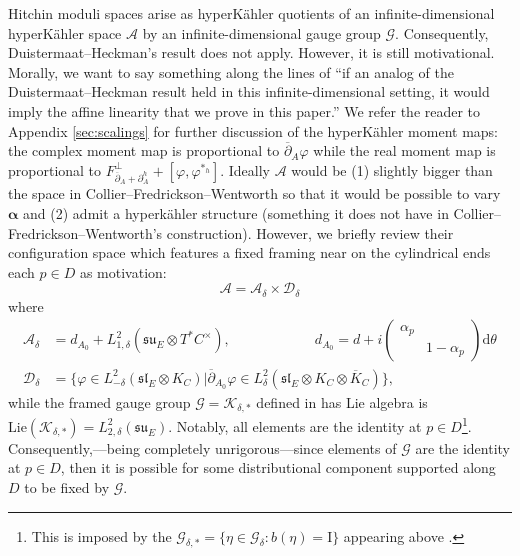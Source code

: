 \documentclass[12pt,letterpaper,reqno]{amsart}
\def\mathbf#1{#1}%
\theoremstyle{remark}
\theoremstyle{definition}
\numberwithin{thm}{section}
\numberwithin{equation}{section}
\numberwithin{figure}{section}
\newcommand{\delbar}{\ensuremath{\overline{\partial}}}
\newcommand{\de}{\mathrm{d}}
\newcommand{\del}{{\partial}}
\begin{document}
 Hitchin moduli spaces arise as hyperK\"ahler quotients of an infinite-dimensional hyperK\"ahler space $\mathcal{A}$ by an infinite-dimensional gauge group $\mathcal{G}$. Consequently, Duistermaat--Heckman's result does not apply. 
 However, it is still motivational. Morally, we want to say something along the lines of ``if an analog of the Duistermaat--Heckman result held in this infinite-dimensional setting,  it would imply the affine linearity that we prove in this paper.''
 We refer the reader to Appendix \ref{sec:scalings} for further discussion of the hyperK\"ahler moment maps: the complex moment map is proportional to $\delbar_A \varphi$ while the real moment map is proportional to $F^\perp_{\delbar_A + \del_A^h} + [\varphi, \varphi^{*_h}]$.
Ideally $\mathcal{A}$ would be (1) slightly bigger than the space in Collier--Fredrickson--Wentworth so that it would be possible to vary $\boldsymbol{\alpha}$ and (2) admit a hyperk\"ahler structure (something it does not have in Collier--Fredrickson--Wentworth's construction). However, we briefly review their configuration space  which features a fixed framing near on the cylindrical ends each $p \in D$ as motivation:
\[ \mathcal{A} = \mathcal{A}_\delta \times \mathcal{D}_\delta
\]
where \begin{align*}\mathcal{A}_\delta &= d_{A_0} + L^2_{1, \delta}(\mathfrak{su}_E \otimes T^*C^\times), \qquad \qquad \qquad  d_{A_0} = d + i \begin{pmatrix} \alpha_p & \\ & 1 - \alpha_p \end{pmatrix} \de \theta\\\mathcal{D}_\delta%
&= \{ \varphi \in L^2_{-\delta}(\mathfrak{sl}_E \otimes K_C) | \delbar_{A_0} \varphi \in L^2_\delta(\mathfrak{sl}_E \otimes K_C \otimes \overline{K}_C)\},\end{align*}
while the framed gauge group $\mathcal{G}=\mathcal{K}_{\delta, *}$ defined in \cite{collier2024conformallimitsparabolicslnchiggs} has Lie algebra is $\mathrm{Lie}(\mathcal{K}_{\delta, *}) = L^2_{2, \delta}(\mathfrak{su}_E)$. Notably, all elements are the identity at $p \in D$\footnote{This is imposed by the $\mathcal{G}_{\delta, *} = \{\eta \in \mathcal{G}_{\delta}: \mathbf{b}(\eta)= \mathrm{I} \}$ appearing above \cite[(3.7)]{collier2024conformallimitsparabolicslnchiggs}.}. Consequently,---being completely unrigorous---since elements of $\mathcal{G}$ are the identity at $p \in D$, then it is possible for some distributional component supported along $D$ to be fixed by $\mathcal{G}$. 
\end{document}

